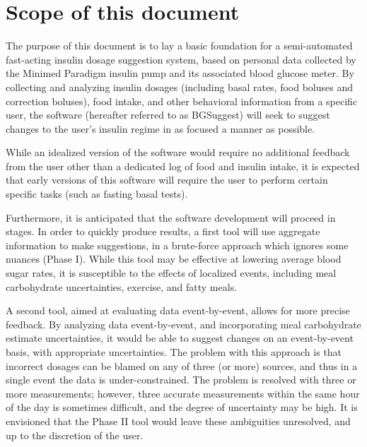



\def\hbac{\ensuremath{\text{HbA}_\text{1c}}}
\def\mgdl{\ensuremath{\text{mg/dL}}}
\def\sens{$\mgdl\over{U}$}
\def\carbratio{\ensuremath{R_\text{I-C}}}
\def\ric{\carbratio}
\def\rbas{\ensuremath{R_\text{Bas}}}



\thispagestyle{empty}
\section{Scope of this document}

The purpose of this document is to lay a basic foundation for a semi-automated fast-acting insulin dosage suggestion system, based on personal data collected by the Minimed Paradigm insulin pump and its associated blood glucose meter. By collecting and analyzing insulin dosages (including basal rates, food boluses and correction boluses), food intake, and other behavioral information from a specific user, the software (hereafter referred to as BGSuggest) will seek to suggest changes to the user's insulin regime in as focused a manner as possible.

While an idealized version of the software would require no additional feedback from the user other than a dedicated log of food and insulin intake, it is expected that early versions of this software will require the user to perform certain specific tasks (such as fasting basal tests).

Furthermore, it is anticipated that the software development will proceed in stages. In order to quickly produce results, a first tool will use aggregate information to make suggestions, in a brute-force approach which ignores some nuances (Phase I). While this tool may be effective at lowering average blood sugar rates, it is susceptible to the effects of localized events, including meal carbohydrate uncertainties, exercise, and fatty meals.

A second tool, aimed at evaluating data event-by-event, allows for more precise feedback. By analyzing data event-by-event, and incorporating meal carbohydrate estimate uncertainties, it would be able to suggest changes on an event-by-event basis, with appropriate uncertainties. The problem with this approach is that incorrect dosages can be blamed on any of three (or more) sources, and thus in a single event the data is under-constrained. The problem is resolved with three or more measurements; however, three accurate measurements within the same hour of the day is sometimes difficult, and the degree of uncertainty may be high. It is envisioned that the Phase II tool would leave these ambiguities unresolved, and up to the discretion of the user.

